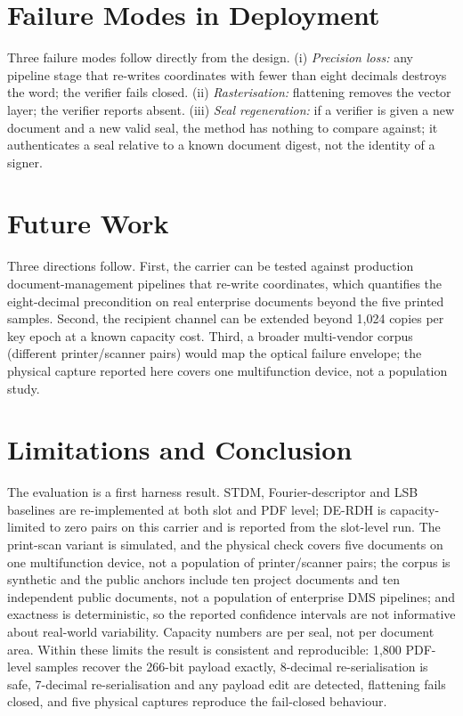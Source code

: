\documentclass[journal]{IEEEtran}
\begin{document}
\section{Failure Modes in Deployment}
Three failure modes follow directly from the design. (i) \emph{Precision loss:} any pipeline stage that re-writes coordinates with fewer than eight decimals destroys the word; the verifier fails closed. (ii) \emph{Rasterisation:} flattening removes the vector layer; the verifier reports absent. (iii) \emph{Seal regeneration:} if a verifier is given a new document and a new valid seal, the method has nothing to compare against; it authenticates a seal relative to a known document digest, not the identity of a signer.

\section{Future Work}
Three directions follow. First, the carrier can be tested against production document-management pipelines that re-write coordinates, which quantifies the eight-decimal precondition on real enterprise documents beyond the five printed samples. Second, the recipient channel can be extended beyond 1{,}024 copies per key epoch at a known capacity cost. Third, a broader multi-vendor corpus (different printer/scanner pairs) would map the optical failure envelope; the physical capture reported here covers one multifunction device, not a population study.

\section{Limitations and Conclusion}\label{sec:conclusion}
The evaluation is a first harness result. STDM, Fourier-descriptor and LSB baselines are re-implemented at both slot and PDF level; DE-RDH is capacity-limited to zero pairs on this carrier and is reported from the slot-level run. The print-scan variant is simulated, and the physical check covers five documents on one multifunction device, not a population of printer/scanner pairs; the corpus is synthetic and the public anchors include ten project documents and ten independent public documents, not a population of enterprise DMS pipelines; and exactness is deterministic, so the reported confidence intervals are not informative about real-world variability. Capacity numbers are per seal, not per document area. Within these limits the result is consistent and reproducible: 1{,}800 PDF-level samples recover the 266-bit payload exactly, 8-decimal re-serialisation is safe, 7-decimal re-serialisation and any payload edit are detected, flattening fails closed, and five physical captures reproduce the fail-closed behaviour.
\end{document}
